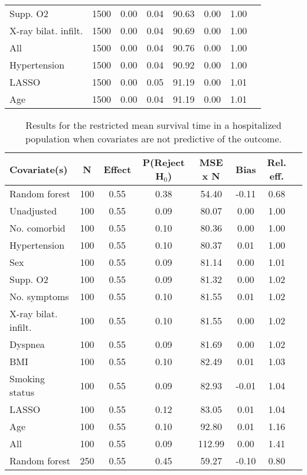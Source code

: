 \documentclass{article}
\begin{document}
{\begin{longtable}{lccccccc}
Supp. O2 & 1500 & 0.00 & 0.04 &  90.63 &  0.00 & 1.00 \\ 
X-ray bilat. infilt. & 1500 & 0.00 & 0.04 &  90.69 &  0.00 & 1.00 \\ 
All & 1500 & 0.00 & 0.04 &  90.76 &  0.00 & 1.00 \\ 
Hypertension & 1500 & 0.00 & 0.04 &  90.92 &  0.00 & 1.00 \\ 
LASSO & 1500 & 0.00 & 0.05 &  91.19 &  0.00 & 1.01 \\ 
Age & 1500 & 0.00 & 0.04 &  91.19 &  0.00 & 1.01 \\
\bottomrule
\hline
\end{longtable}
}

\clearpage

{\tabcolsep=6pt  %
\begin{longtable}{lccccccc}
\caption{Results for the restricted mean survival time in a hospitalized population when covariates are not predictive of the outcome.} \\
Covariate(s) & N & Effect & P(Reject H$_0$) & MSE x N & Bias & Rel. eff.\\ \midrule
Random forest & 100 & 0.55 & 0.38 &  54.40 & -0.11 & 0.68 \\ 
Unadjusted & 100 & 0.55 & 0.09 &  80.07 &  0.00 & 1.00 \\ 
No. comorbid & 100 & 0.55 & 0.10 &  80.36 &  0.00 & 1.00 \\ 
Hypertension & 100 & 0.55 & 0.10 &  80.37 &  0.01 & 1.00 \\ 
Sex & 100 & 0.55 & 0.09 &  81.14 &  0.00 & 1.01 \\ 
Supp. O2 & 100 & 0.55 & 0.09 &  81.32 &  0.00 & 1.02 \\ 
No. symptoms & 100 & 0.55 & 0.10 &  81.55 &  0.01 & 1.02 \\ 
X-ray bilat. infilt. & 100 & 0.55 & 0.10 &  81.55 &  0.00 & 1.02 \\ 
Dyspnea & 100 & 0.55 & 0.09 &  81.69 &  0.00 & 1.02 \\ 
BMI & 100 & 0.55 & 0.10 &  82.49 &  0.01 & 1.03 \\ 
Smoking status & 100 & 0.55 & 0.09 &  82.93 & -0.01 & 1.04 \\ 
LASSO & 100 & 0.55 & 0.12 &  83.05 &  0.01 & 1.04 \\ 
Age & 100 & 0.55 & 0.10 &  92.80 &  0.01 & 1.16 \\ 
All & 100 & 0.55 & 0.09 & 112.99 &  0.00 & 1.41 \\ \midrule() 
Random forest & 250 & 0.55 & 0.45 &  59.27 & -0.10 & 0.80 \\ 

\end{longtable}}
\end{document}
